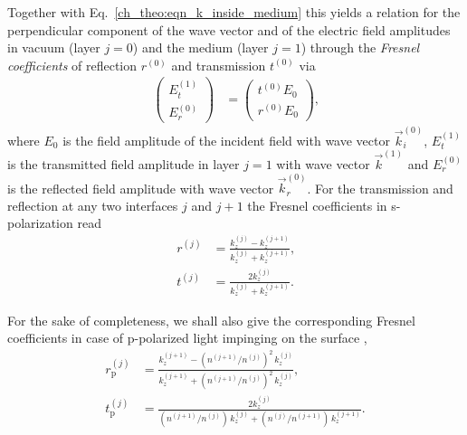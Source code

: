 Together with Eq.~\ref{ch_theo:eqn_k_inside_medium} this yields a relation for the perpendicular component of the wave vector and of the electric field amplitudes in vacuum (layer $j=0$) and the medium (layer $j=1$) through the \emph{Fresnel coefficients} of reflection $r^{(0)}$ and transmission $t^{(0)}$ via
\begin{align}
\begin{pmatrix}
E_t^{(1)}  \\ 
E_r^{(0)}
\end{pmatrix} &=
\begin{pmatrix}
t^{(0)} E_0 \\
r^{(0)} E_0
\end{pmatrix} \text{,} \label{ch_theo:eqn_fresnel_reflection}
\end{align}
where $E_0$ is the field amplitude of the incident field with wave vector $\vec{k}_i^{(0)}$, $E_t^{(1)}$ is the transmitted field amplitude in layer $j=1$ with wave vector $\vec{k}^{(1)}$ and $E_r^{(0)}$ is the reflected field amplitude with wave vector $\vec{k}_r^{(0)}$. For the transmission and reflection at any two interfaces $j$ and $j+1$ the Fresnel coefficients in s-polarization read
\begin{align}
        r^{(j)} &= \frac{k_z^{(j)} - k_z^{(j+1)}}{k_z^{(j)} + 
k_z^{(j+1)}}\text{,}  \label{ch_theo:eqn_fresnel_reflection_coefficient}\\
        t^{(j)} &= \frac{2 k_z^{(j)}}{k_z^{(j)} + k_z^{(j+1)}}\text{.}  \label{ch_theo:eqn_fresnel_transmission_coefficient}
\end{align}

For the sake of completeness, we shall also give the corresponding Fresnel coefficients in case of p-polarized light impinging on the surface \cite{born_principles_1965},
\begin{align}
        r_\text{p}^{(j)} &= \frac{k_z^{(j+1)} - (n^{(j+1)}/ n^{(j)})^2 \,k_z^{(j)}}{k_z^{(j+1)} + (n^{(j+1)}/ n^{(j)})^2\, k_z^{(j)}}\text{,}  \label{ch_theo:eqn_fresnel_reflection_coefficient}\\
        t_\text{p}^{(j)} &= \frac{2 k_z^{(j)}}{(n^{(j+1)}/ n^{(j)}) \,k_z^{(j)} +  (n^{(j)}/ n^{(j+1)})\, k_z^{(j+1)}}\text{.}  \label{ch_theo:eqn_fresnel_transmission_coefficient_p_pol}
\end{align}



